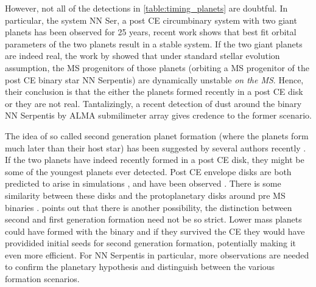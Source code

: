 \documentclass[ twoside,openright,titlepage,numbers=noenddot,headinclude,%
                footinclude=true,cleardoublepage=empty,abstractoff, %
                BCOR=5mm,paper=a4,fontsize=11pt,%
                american,%
                ]{scrreprt}
\begin{document}
However, not all of the detections in \cref{table:timing_planets} are doubtful. 
In particular, the system NN Ser, a post CE circumbinary system with 
two giant planets has been observed for 25 years, recent work \citep{Marsh2013}
shows that best fit orbital parameters of the two planets result in a stable
system. If the two giant planets are indeed real, the work by 
\cite{Mustill2013a} showed that under standard stellar evolution assumption, 
the MS progenitors of those planets (orbiting a MS progenitor of the post CE
binary star NN Serpentis) are dynamically unstable \emph{on the MS}. Hence, 
their conclusion is that the either the planets formed recently in a post CE
disk or they are not real. Tantalizingly, a recent detection of dust around
the binary NN Serpentis by ALMA submilimeter array gives credence to the former
scenario.

The idea of so called second generation planet formation (where the planets
form much later than their host star) has been suggested by several authors 
recently \citep{Perets2010,Schleicher2014,Volschow2014}. If the two planets
have indeed recently formed in a post CE disk, they might be some of the
youngest planets ever detected. Post CE envelope disks are both predicted
to arise in simulations \citep{Ivanova2013}, and have been observed 
\citep{vanWinckel2009}. There is some similarity between these disks and 
the protoplanetary disks around pre MS binaries \citep{deRuyter2006}. 
\cite{Perets2010} points out that there is another possibility, the distinction
between second and first generation formation need not be so strict. Lower
mass planets could have formed with the binary and if they survived the 
CE they would have providided initial seeds for second generation formation,
potentially making it even more efficient. For NN Serpentis in particular, 
more observations are needed to confirm the planetary hypothesis and 
distinguish between the various formation scenarios. 
\end{document}
